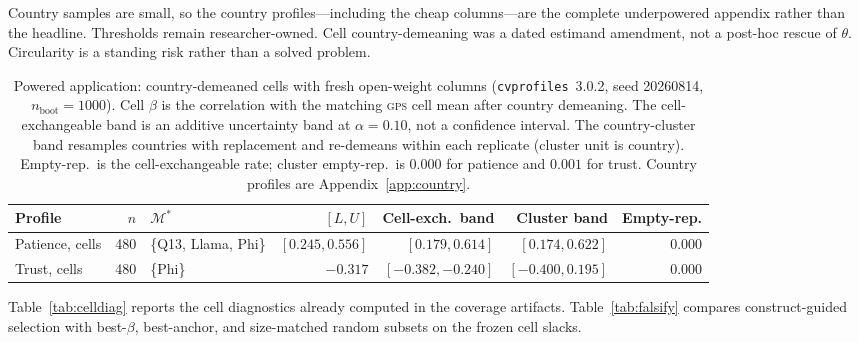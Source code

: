 \documentclass[10pt,letterpaper]{article}
\newcommand{\GPS}{\textsc{gps}}
\newcommand{\cvp}{\texttt{cvprofiles}}
\newcommand{\M}{\ensuremath{\mathcal{M}}}
\begin{document}
Country samples are small, so the country profiles---including the cheap columns---are the complete underpowered appendix rather than the headline.
Thresholds remain researcher-owned.
Cell country-demeaning was a dated estimand amendment, not a post-hoc rescue of $\theta$.
Circularity is a standing risk rather than a solved problem.

\begin{table}[t]
\centering
\small
\caption{Powered application: country-demeaned cells with fresh open-weight columns (\cvp{}~3.0.2, seed 20260814, $n_{\mathrm{boot}}=1000$).
Cell $\beta$ is the correlation with the matching \GPS{} cell mean after country demeaning.
The cell-exchangeable band is an additive uncertainty band at $\alpha=0.10$, not a confidence interval.
The country-cluster band resamples countries with replacement and re-demeans within each replicate (cluster unit is country).
Empty-rep.\ is the cell-exchangeable rate; cluster empty-rep.\ is $0.000$ for patience and $0.001$ for trust.
Country profiles are Appendix~\ref{app:country}.}
\label{tab:twores}
\begin{tabularx}{\textwidth}{@{}>{\raggedright\arraybackslash}p{2.15cm} r >{\raggedright\arraybackslash}X r r r r@{}}
\toprule
\textbf{Profile} & $n$ & $\M^*$ & $[L,U]$ & \textbf{Cell-exch.\ band} & \textbf{Cluster band} & \textbf{Empty-rep.} \\
\midrule
Patience, cells & 480 & \{Q13, Llama, Phi\} & $[0.245,0.556]$ & $[0.179,0.614]$ & $[0.174,0.622]$ & $0.000$ \\
Trust, cells & 480 & \{Phi\} & $-0.317$ & $[-0.382,-0.240]$ & $[-0.400,0.195]$ & $0.000$ \\
\bottomrule
\end{tabularx}
\end{table}

Table~\ref{tab:celldiag} reports the cell diagnostics already computed in the coverage artifacts.
Table~\ref{tab:falsify} compares construct-guided selection with best-$\beta$, best-anchor, and size-matched random subsets on the frozen cell slacks.
\end{document}
